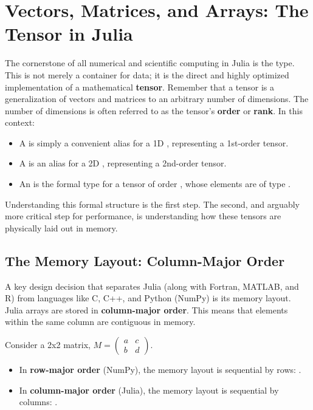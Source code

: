 \section{Vectors, Matrices, and Arrays: The Tensor in Julia}
\label{sec:julia_arrays}
The cornerstone of all numerical and scientific computing in Julia is the \textbf{} type. This is not merely a container for data; it is the direct and highly optimized implementation of a mathematical \textbf{tensor}. Remember that a tensor is a generalization of vectors and matrices to an arbitrary number of dimensions. The number of dimensions is often referred to as the tensor's \textbf{order} or \textbf{rank}. In this context:
\begin{itemize}
    \item A \textbf{} is simply a convenient alias for a 1D , representing a 1st-order tensor.
    \item A \textbf{} is an alias for a 2D , representing a 2nd-order tensor.
    \item An  is the formal type for a tensor of order , whose elements are of type .
\end{itemize}
Understanding this formal structure is the first step. The second, and arguably more critical step for performance, is understanding how these tensors are physically laid out in memory.

\subsection*{The Memory Layout: Column-Major Order}
A key design decision that separates Julia (along with Fortran, MATLAB, and R) from languages like C, C++, and Python (NumPy) is its memory layout. Julia arrays are stored in \textbf{column-major order}. This means that elements within the same column are contiguous in memory.

Consider a 2x2 matrix, $M = \begin{pmatrix} a & c \\ b & d \end{pmatrix}$.
\begin{itemize}
    \item In \textbf{row-major order} (NumPy), the memory layout is sequential by rows: \code{[a, c, b, d]}.
    \item In \textbf{column-major order} (Julia), the memory layout is sequential by columns: \code{[a, b, c, d]}.
\end{itemize}



